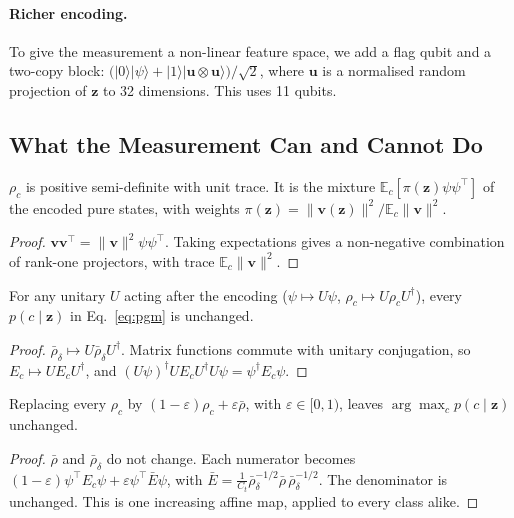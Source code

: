 \paragraph{Richer encoding.}
To give the measurement a non-linear feature space, we add a flag qubit and
a two-copy block:
$\big(|0\rangle|\psi\rangle+|1\rangle|\mathbf u\otimes\mathbf u\rangle\big)/\sqrt2$,
where $\mathbf u$ is a normalised random projection of $\mathbf z$ to 32
dimensions. This uses 11 qubits.

\subsection{What the Measurement Can and Cannot Do}
\label{sec:theory}

\begin{proposition}\label{prop:state}
$\rho_c$ is positive semi-definite with unit trace. It is the mixture
$\mathbb E_c[\pi(\mathbf z)\psi\psi^{\top}]$ of the encoded pure states, with
weights $\pi(\mathbf z)=\|\mathbf v(\mathbf z)\|^2/\mathbb E_c\|\mathbf v\|^2$.
\end{proposition}
\begin{proof}
$\mathbf v\mathbf v^{\top}=\|\mathbf v\|^2\psi\psi^{\top}$. Taking expectations gives a
non-negative combination of rank-one projectors, with trace
$\mathbb E_c\|\mathbf v\|^2$.
\end{proof}

\begin{proposition}\label{prop:unitary}
For any unitary $U$ acting after the encoding ($\psi\mapsto U\psi$,
$\rho_c\mapsto U\rho_cU^{\dagger}$), every $p(c\mid\mathbf z)$ in
Eq.~\eqref{eq:pgm} is unchanged.
\end{proposition}
\begin{proof}
$\bar\rho_\delta\mapsto U\bar\rho_\delta U^{\dagger}$. Matrix functions commute with
unitary conjugation, so $E_c\mapsto UE_cU^{\dagger}$, and
$(U\psi)^{\dagger}UE_cU^{\dagger}U\psi=\psi^{\dagger}E_c\psi$.
\end{proof}

\begin{proposition}\label{prop:shrink}
Replacing every $\rho_c$ by $(1-\varepsilon)\rho_c+\varepsilon\bar\rho$, with
$\varepsilon\in[0,1)$, leaves $\arg\max_cp(c\mid\mathbf z)$ unchanged.
\end{proposition}
\begin{proof}
$\bar\rho$ and $\bar\rho_\delta$ do not change. Each numerator becomes
$(1-\varepsilon)\psi^{\top}E_c\psi+\varepsilon\psi^{\top}\bar E\psi$, with
$\bar E=\frac1{C_t}\bar\rho_\delta^{-1/2}\bar\rho\,\bar\rho_\delta^{-1/2}$. The
denominator is unchanged. This is one increasing affine map, applied to
every class alike.
\end{proof}

